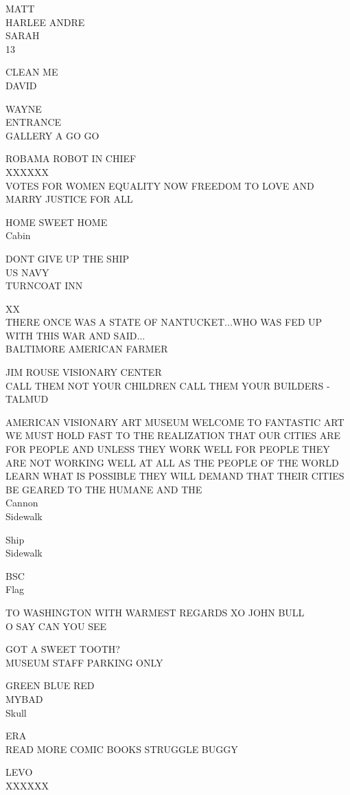 \documentclass[10pt,letterpaper]{article}
\begin{document}
MATT\\
HARLEE ANDRE\\
SARAH\\
13

CLEAN ME\\
DAVID

WAYNE\\
ENTRANCE\\
GALLERY A GO GO

ROBAMA ROBOT IN CHIEF\\
XXXXXX\\
VOTES FOR WOMEN EQUALITY NOW FREEDOM TO LOVE AND MARRY JUSTICE FOR ALL

HOME SWEET HOME\\
Cabin

DONT GIVE UP THE SHIP\\
US NAVY\\
TURNCOAT INN

XX\\
THERE ONCE WAS A STATE OF NANTUCKET...WHO WAS FED UP WITH THIS WAR AND SAID...\\
BALTIMORE AMERICAN FARMER

JIM ROUSE VISIONARY CENTER\\
CALL THEM NOT YOUR CHILDREN CALL THEM YOUR BUILDERS {-} TALMUD

AMERICAN VISIONARY ART MUSEUM WELCOME TO FANTASTIC ART\\
WE MUST HOLD FAST TO THE REALIZATION THAT OUR CITIES ARE FOR PEOPLE AND UNLESS THEY WORK WELL FOR PEOPLE THEY ARE NOT WORKING WELL AT ALL AS THE PEOPLE OF THE WORLD LEARN WHAT IS POSSIBLE THEY WILL DEMAND THAT THEIR CITIES BE GEARED TO THE HUMANE AND THE\\
Cannon\\
Sidewalk

Ship\\
Sidewalk

BSC\\
Flag

TO WASHINGTON WITH WARMEST REGARDS XO JOHN BULL\\
O SAY CAN YOU SEE

GOT A SWEET TOOTH?\\
MUSEUM STAFF PARKING ONLY

GREEN BLUE RED\\
MYBAD\\
Skull

ERA\\
READ MORE COMIC BOOKS STRUGGLE BUGGY

LEVO\\
XXXXXX
\end{document}
